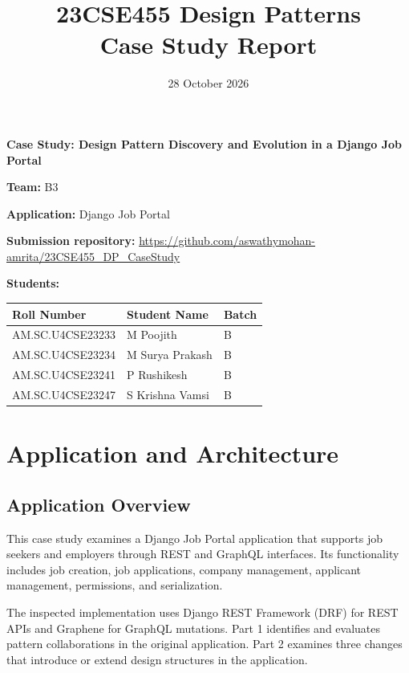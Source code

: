 \documentclass[11pt,a4paper]{article}
\title{\textbf{23CSE455 Design Patterns}\\
Case Study Report}
\date{28 October 2026}
\begin{document}
\maketitle

\begin{center}
\textbf{Case Study: Design Pattern Discovery and Evolution
in a Django Job Portal}
\end{center}

\textbf{Team:} B3

\textbf{Application:} Django Job Portal

\textbf{Submission repository:}
\url{https://github.com/aswathymohan-amrita/23CSE455_DP_CaseStudy}

\textbf{Students:}

\begin{tabularx}{\linewidth}{@{}lXl@{}}
\toprule
Roll Number & Student Name & Batch\\
\midrule
AM.SC.U4CSE23233 & M Poojith & B\\
AM.SC.U4CSE23234 & M Surya Prakash & B\\
AM.SC.U4CSE23241 & P Rushikesh & B\\
AM.SC.U4CSE23247 & S Krishna Vamsi & B\\
\bottomrule
\end{tabularx}

\section{Application and Architecture}

\subsection{Application Overview}

This case study examines a Django Job Portal application
that supports job seekers and employers through REST and
GraphQL interfaces. Its functionality includes job creation,
job applications, company management, applicant management,
permissions, and serialization.

The inspected implementation uses Django REST Framework
(DRF) for REST APIs and Graphene for GraphQL mutations.
Part 1 identifies and evaluates pattern collaborations in
the original application. Part 2 examines three changes
that introduce or extend design structures in the application.
\end{document}
